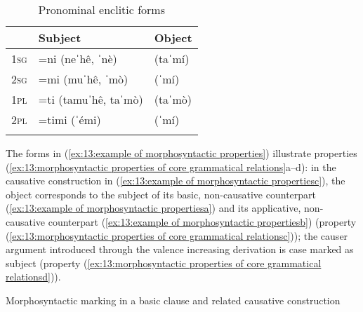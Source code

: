 
\begin{table}
\caption{Pronominal enclitic forms}
\label{tab:enclitics-2}

\begin{tabularx}{.5\textwidth}{lll}
\lsptoprule
& \textbf{Subject} & \textbf{Object}\\
\midrule
 \textsc{1sg} & =ni (neˈhê, ˈnè) & (taˈmí)\\
 \textsc{2sg} & =mi (muˈhê, ˈmò) & (ˈmí)\\
 \textsc{1pl} & =ti (tamuˈhê, taˈmò) & (taˈmò)\\
 \textsc{2pl} & =timi (ˈémi) & (ˈmí)\\
\lspbottomrule
\end{tabularx}
\end{table}

The forms in (\ref{ex:13:example of morphosyntactic properties}) illustrate properties (\ref{ex:13:morphosyntactic properties of core grammatical relations}a--d): in the causative construction in (\ref{ex:13:example of morphosyntactic propertiesc}), the object corresponds to the subject of its basic, non-causative counterpart (\ref{ex:13:example of morphosyntactic propertiesa}) and its applicative, non-causative counterpart (\ref{ex:13:example of morphosyntactic propertiesb}) (property (\ref{ex:13:morphosyntactic properties of core grammatical relationsc})); the causer argument introduced through the valence increasing derivation is case marked as subject (property (\ref{ex:13:morphosyntactic properties of core grammatical relationsd})).


\ea\label{ex:13:example of morphosyntactic properties}
{Morphosyntactic marking in a basic clause and related causative construction}

